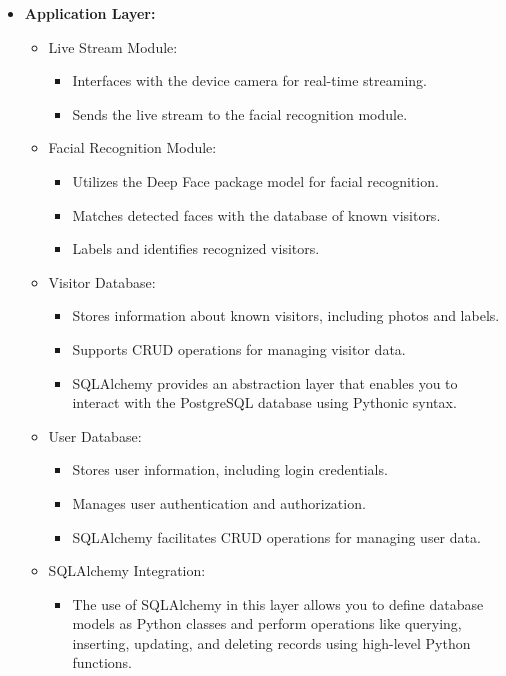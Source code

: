 \documentclass[a4 paper, 12pt]{article}
\begin{document}
\begin{enumerate}
\begin{itemize}
            \item \textbf{Application Layer:}
                \begin{itemize}
                    \item Live Stream Module:
                        \begin{itemize}
                            \item Interfaces with the device camera for real-time streaming.
                            \item Sends the live stream to the facial recognition module.
                        \end{itemize}
                    \item Facial Recognition Module:
                        \begin{itemize}
                            \item Utilizes the Deep Face package model for facial recognition.
                            \item Matches detected faces with the database of known visitors.
                            \item Labels and identifies recognized visitors.
                        \end{itemize}
                    \item Visitor Database:
                        \begin{itemize}
                            \item Stores information about known visitors, including photos and labels.
                            \item Supports CRUD operations for managing visitor data.
                            \item SQLAlchemy provides an abstraction layer that enables you to interact with the PostgreSQL database using Pythonic syntax.
                        \end{itemize}
                    \item User Database:
                        \begin{itemize}
                            \item Stores user information, including login credentials.
                            \item Manages user authentication and authorization.
                            \item SQLAlchemy facilitates CRUD operations for managing user data.
                        \end{itemize}
                    \item SQLAlchemy Integration: \begin{itemize}
                    \item The use of SQLAlchemy in this layer allows you to define database models as Python classes and perform operations like querying, inserting, updating, and deleting records using high-level Python functions.
                    \end{itemize}
                \end{itemize}
            

\end{itemize}
\end{enumerate}
\end{document}
